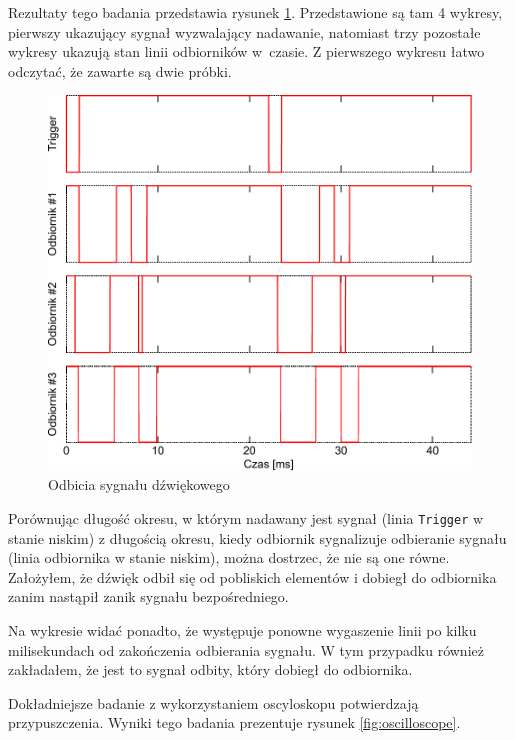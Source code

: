Rezultaty tego badania przedstawia rysunek \ref{fig:logic_analyzer}. Przedstawione są tam 4 wykresy, pierwszy ukazujący sygnał wyzwalający nadawanie, natomiast trzy pozostałe wykresy ukazują stan linii odbiorników w~czasie. Z pierwszego wykresu łatwo odczytać, że zawarte są dwie próbki.

\begin{figure}
 \includegraphics[width=\textwidth]{gfx/odbicia.pdf}
 \caption{Odbicia sygnału dźwiękowego}
 \label{fig:logic_analyzer}
\end{figure}

Porównując długość okresu, w którym nadawany jest sygnał (linia \texttt{Trigger} w stanie niskim) z długością okresu, kiedy odbiornik sygnalizuje odbieranie sygnału (linia odbiornika w stanie niskim), można dostrzec, że nie są one równe. Założyłem, że dźwięk odbił się od pobliskich elementów i dobiegł do odbiornika zanim nastąpił zanik sygnału bezpośredniego.

Na wykresie widać ponadto, że występuje ponowne wygaszenie linii po kilku milisekundach od zakończenia odbierania sygnału. W tym przypadku również zakładałem, że jest to sygnał odbity, który dobiegł do odbiornika.

Dokładniejsze badanie z wykorzystaniem oscyloskopu potwierdzają przypuszczenia. Wyniki tego badania prezentuje rysunek \ref{fig:oscilloscope}.

